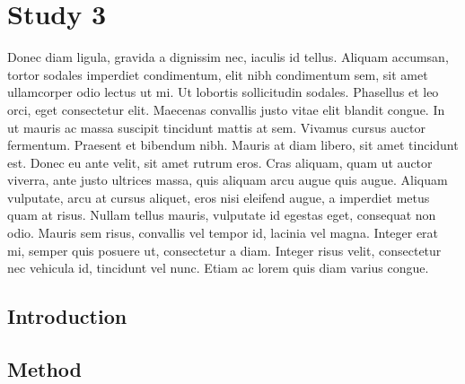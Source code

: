 \chapter{Study 3}
\label{ch:study3}

\newpage
Donec diam ligula, gravida a dignissim nec, iaculis id tellus. Aliquam accumsan, tortor sodales imperdiet condimentum, elit nibh condimentum sem, sit amet ullamcorper odio lectus ut mi. Ut lobortis sollicitudin sodales. Phasellus et leo orci, eget consectetur elit. Maecenas convallis justo vitae elit blandit congue. In ut mauris ac massa suscipit tincidunt mattis at sem. Vivamus cursus auctor fermentum. Praesent et bibendum nibh. Mauris at diam libero, sit amet tincidunt est. Donec eu ante velit, sit amet rutrum eros. Cras aliquam, quam ut auctor viverra, ante justo ultrices massa, quis aliquam arcu augue quis augue. Aliquam vulputate, arcu at cursus aliquet, eros nisi eleifend augue, a imperdiet metus quam at risus. Nullam tellus mauris, vulputate id egestas eget, consequat non odio. Mauris sem risus, convallis vel tempor id, lacinia vel magna. Integer erat mi, semper quis posuere ut, consectetur a diam. Integer risus velit, consectetur nec vehicula id, tincidunt vel nunc. Etiam ac lorem quis diam varius congue.

\erdos

\section{Introduction}
\label{study3:intro}
\lorem
\lorem
\lorem
\lorem


\section{Method}
\label{study3:method}
